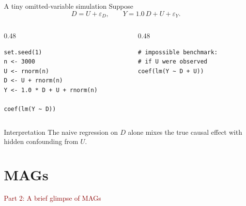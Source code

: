 \documentclass[dvipsnames,aspectratio=169,handout]{beamer}
\begin{document}
\begin{frame}[fragile]{A tiny omitted-variable simulation}
Suppose
\[
D = U + \varepsilon_D,
\qquad
Y = 1.0\, D + U + \varepsilon_Y.
\]

\begin{columns}[T,onlytextwidth]
\begin{column}{0.48\textwidth}
\begin{lstlisting}
set.seed(1)
n <- 3000
U <- rnorm(n)
D <- U + rnorm(n)
Y <- 1.0 * D + U + rnorm(n)

coef(lm(Y ~ D))
\end{lstlisting}
\end{column}
\begin{column}{0.48\textwidth}
\begin{lstlisting}
# impossible benchmark:
# if U were observed
coef(lm(Y ~ D + U))
\end{lstlisting}
\end{column}
\end{columns}

\begin{alertblock}{Interpretation}
The naive regression on $D$ alone mixes the true causal effect with hidden confounding from $U$.
\end{alertblock}
\end{frame}


\section{MAGs}

\begin{frame}{}
\begin{center}
{\Huge \textcolor{DarkRed}{Part 2: A brief glimpse of MAGs}}
\end{center}
\end{frame}
\end{document}
